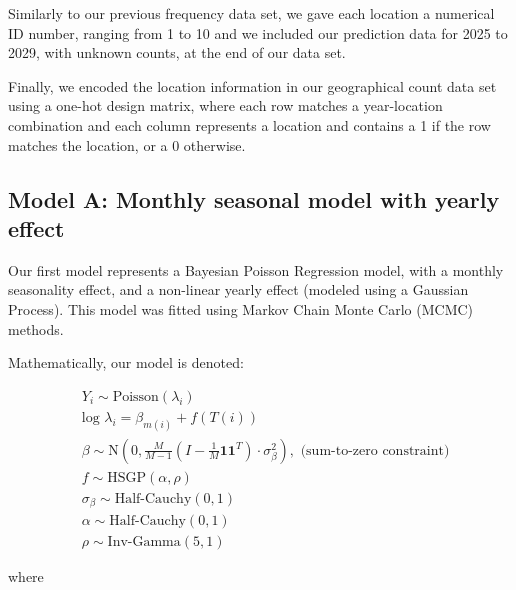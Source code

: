 \documentclass[
]{article}
\begin{document}
Similarly to our previous frequency data set, we gave each location a numerical ID number, ranging from 1 to 10 and we included our prediction data for 2025 to 2029, with unknown counts, at the end of our data set.

Finally, we encoded the location information in our geographical count data set using a one-hot design matrix, where each row matches a year-location combination and each column represents a location and contains a 1 if the row matches the location, or a 0 otherwise.

\subsection{Model A: Monthly seasonal model with yearly effect}\label{model-a-monthly-seasonal-model-with-yearly-effect}

Our first model represents a Bayesian Poisson Regression model, with a monthly seasonality effect, and a non-linear yearly effect (modeled using a Gaussian Process). This model was fitted using Markov Chain Monte Carlo (MCMC) methods.

Mathematically, our model is denoted:

\begin{align*}
&Y_{i} \sim \text{Poisson}(\lambda_{i})\\
&\text{log } \lambda_{i} =  \beta_{m(i)} + f(T(i))\\
&\beta \sim \text{N}( 0, \frac{M}{M-1}( I - \frac{1}{M} \mathbf{1}\mathbf{1}^T) \cdot \sigma_{\beta}^2), \text{  (sum-to-zero constraint)}\\
& f \sim \text{HSGP}(\alpha, \rho)\\
&\sigma_{\beta} \sim \text{Half-Cauchy}(0,1)\\
&\alpha \sim \text{Half-Cauchy}(0,1) \\
&\rho \sim \text{Inv-Gamma}(5,1)
\end{align*}

where
\end{document}
